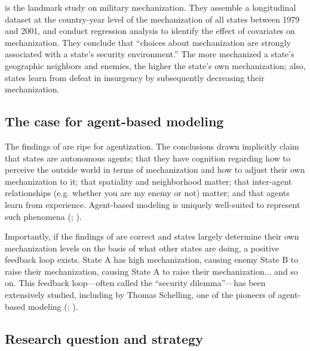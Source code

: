 \documentclass{article}
\begin{document}
\cite{sechser2010army} is the landmark study on military mechanization. They
assemble a longitudinal dataset at the country-year level of the mechanization
of all states between 1979 and 2001, and conduct regression analysis to identify
the effect of covariates on mechanization. They conclude that ``choices about
mechanization are strongly associated with a state's security environment.''
The more mechanized a state's geographic neighbors and enemies, the higher the state's 
own mechanization; also, states
learn from defeat in insurgency by subsequently decreasing their mechanization.

\subsection{The case for agent-based modeling}

The findings of \cite{sechser2010army} are ripe for agentization. The
conclusions drawn implicitly claim
that states are autonomous agents; that they have
cognition regarding how to perceive the outside world in terms of mechanization
and how to adjust their own mechanization to it; that spatiality and
neighborhood matter; that inter-agent relationships (e.g. whether you are my
enemy or not) matter; and that
agents learn from experience. Agent-based modeling is uniquely well-suited to
represent such phenomena (\cite{gilbert2005simulation};
\cite{miller2009complex}).

Importantly, if the findings of \cite{sechser2010army} are correct and states
largely determine their own mechanization levels on the basis of what other
states are doing, a positive feedback loop exists. State A has high
mechanization, causing enemy State B to raise their mechanization, causing State
A to raise their mechanization... and so on. This feedback loop---often called
the ``security dilemma''---has been extensively studied, including by Thomas Schelling, one of the pioneers
of agent-based modeling (\cite{schelling1960strategy};
\cite{schelling2006micromotives}).

\subsection{Research question and strategy}
\end{document}
